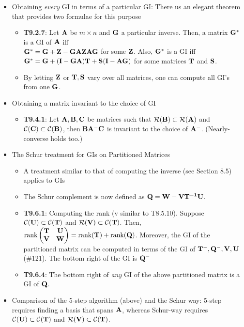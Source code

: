 \documentclass[a4paper, oneside]{book}
\begin{document}
\begin{itemize}
\begin{itemize}
	\end{itemize}
	\item Obtaining \textit{every} GI in terms of a particular GI: There us an elegant theorem that provides two formulae for this purpose
	\begin{itemize}
		\item \textbf{T9.2.7}: Let $\mathbf A$ be $m\times n$ and $\mathbf G$ a particular inverse. Then, a matrix $\mathbf G^*$ is a GI of $\mathbf A$ iff \\
	$\mathbf G^* = \mathbf{G+Z-GAZAG}$ for some $\mathbf Z$. Also, $\mathbf G^*$ is a GI iff \\
	$\mathbf{G^*=G+(I-GA)T+S(I-AG)}$ for some matrices $\mathbf T$ and $\mathbf S$.
		\item By letting $\mathbf Z$ or $\mathbf{T, S}$ vary over all matrices, one can compute all GI's from one $\mathbf G$.
	\end{itemize}
	\item Obtaining a matrix invariant to the choice of GI
	\begin{itemize}
	\item \textbf{T9.4.1}: 	Let $\mathbf{A,B,C}$ be matrices such that $\mathcal{R}(\mathbf B) \subset \mathcal{R}(\mathbf A)$ and $\mathcal{C}(\mathbf C) \subset \mathcal{C}(\mathbf B)$, then $\mathbf{BA^-C}$ is invariant to the choice of $\mathbf A^-$. (Nearly-converse holds too.)
	\end{itemize}
	\item The Schur treatment for GIs on Partitioned Matrices
	\begin{itemize}
	\item A treatment similar to that of computing the inverse (see Section 8.5) applies to GIs
	\item The Schur complement is now defined as $\mathbf{Q=W-VT^{-1}U}$. 
	\item \textbf{T9.6.1}: Computing the rank (v similar to T8.5.10). Suppose $\mathcal{C}(\mathbf U) \subset \mathcal{C}(\mathbf T)$ and $\mathcal{R}(\mathbf V) \subset \mathcal{C}(\mathbf T)$. Then, $\text{rank}\left(\begin{matrix}
	\mathbf T & \mathbf U \\ \mathbf V & \mathbf W
	\end{matrix}\right) = \text{rank}(\mathbf T) + \text{rank}(\mathbf Q)$. Moreover, the GI of the partitioned matrix can be computed in terms of the GI of $\mathbf T^{-}, \mathbf Q^{-}, \mathbf V, \mathbf U$ (\#121). The bottom right of the GI is $\mathbf Q^-$
	\item \textbf{T9.6.4}: The bottom right of \textit{any} GI of the above partitioned matrix is a GI of $\mathbf Q$.
	\end{itemize}
\item Comparison of the 5-step algorithm (above) and the Schur way: 5-step requires finding a basis that spans $\mathbf A$, whereas Schur-way requires $\mathcal{C}(\mathbf U) \subset \mathcal{C}(\mathbf T)$ and $\mathcal{R}(\mathbf V) \subset \mathcal{C}(\mathbf T)$.
\end{itemize}
\end{document}
